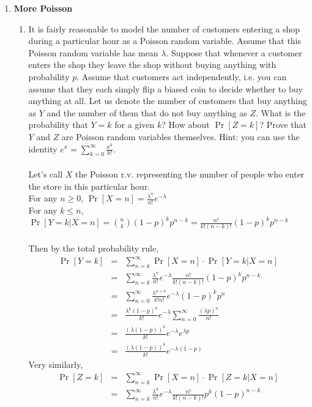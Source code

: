 \documentclass[11pt,fleqn]{article}
\begin{document}
\begin{enumerate}
\newpage
\item \textbf{More Poisson}
\begin{enumerate}
\item  It is fairly reasonable to model the number of customers entering a shop during a particular hour as a Poisson random variable. Assume that this Poisson random variable has mean $\lambda$. Suppose that whenever a customer enters the shop they leave the shop without buying anything with probability $p$. Assume that customers act independently, i.e. you can assume that they each simply flip a biased coin to decide whether to buy anything at all. Let us denote the number of customers that buy anything as $Y$ and the number of them that do not buy anything as $Z$. 
What is the probability that $Y=k$ for a given $k$? How about $\Pr[Z=k]$? Prove that $Y$ and $Z$ are Poisson random variables themselves. Hint: you can use the identity $e^x=\sum_{k=0}^{\infty}\frac{x^k}{k!}$. \\\\
Let's call $X$ the Poisson r.v. representing the number of people who enter the store in this particular hour. \\
For any $n\geq 0$, $\displaystyle\Pr[X=n] = \frac{\lambda^n}{n!}e^{-\lambda}$ \\
For any $k\leq n$, $\displaystyle\Pr[Y=k|X=n] = \binom{n}k(1-p)^kp^{n-k} = \frac{n!}{k!(n-k)!}(1-p)^kp^{n-k}$ \\\\
Then by the total probability rule,
\begin{eqnarray*}
\Pr[Y=k] &=& \sum_{n=k}^{\infty} \Pr[X=n]\cdot\Pr[Y=k|X=n] \\
&=& \sum_{n=k}^{\infty} \frac{\lambda^n}{n!}e^{-\lambda}\frac{n!}{k!(n-k)!}(1-p)^kp^{n-k} \\
&=& \sum_{n=0}^{\infty} \frac{\lambda^{n+k}}{k!n!}e^{-\lambda}(1-p)^kp^n \\
&=& \frac{\lambda^k (1-p)^k}{k!}e^{-\lambda} \sum_{n=0}^{\infty} \frac{(\lambda p)^n}{n!} \\
&=& \frac{(\lambda(1-p))^k}{k!}e^{-\lambda}e^{\lambda p} \\
&=& \frac{(\lambda(1-p))^k}{k!}e^{-\lambda(1-p)}
\end{eqnarray*}
Very similarly,
\begin{eqnarray*}
\Pr[Z=k] &=& \sum_{n=k}^{\infty} \Pr[X=n]\cdot\Pr[Z=k|X=n] \\
&=& \sum_{n=k}^{\infty} \frac{\lambda^n}{n!}e^{-\lambda}\frac{n!}{k!(n-k)!}p^k(1-p)^{n-k} \\

\end{eqnarray*}
\end{enumerate}
\end{enumerate}
\end{document}
